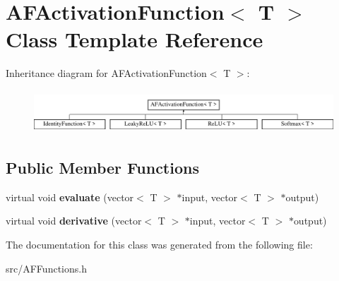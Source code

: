 \hypertarget{classAFActivationFunction}{}\section{A\+F\+Activation\+Function$<$ T $>$ Class Template Reference}
\label{classAFActivationFunction}
Inheritance diagram for A\+F\+Activation\+Function$<$ T $>$\+:\begin{figure}[H]
\begin{center}
\leavevmode
\includegraphics[height=1.618497cm]{classAFActivationFunction}
\end{center}
\end{figure}
\subsection*{Public Member Functions}
\begin{DoxyCompactItemize}
\item 
\mbox{\label{classAFActivationFunction_afe574932347deabec0b6812ac2e9a26e}} 
virtual void {\bfseries evaluate} (vector$<$ T $>$ $\ast$input, vector$<$ T $>$ $\ast$output)
\item 
\mbox{\label{classAFActivationFunction_abe287144b42493f733d2e84cd51fb03f}} 
virtual void {\bfseries derivative} (vector$<$ T $>$ $\ast$input, vector$<$ T $>$ $\ast$output)
\end{DoxyCompactItemize}


The documentation for this class was generated from the following file\+:\begin{DoxyCompactItemize}
\item 
src/A\+F\+Functions.\+h\end{DoxyCompactItemize}
